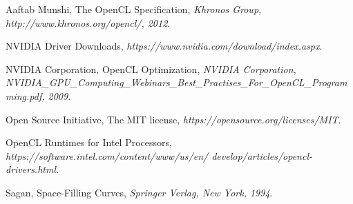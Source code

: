 \documentclass[a4paper,12pt]{article}
\begin{document}
\begin{thebibliography}{99}
	Aaftab Munshi,
	The OpenCL Specification,
	\emph{Khronos Group, http://www.khronos.org/opencl/, 2012}.

	NVIDIA Driver Downloads,
	\emph{https://www.nvidia.com/download/index.aspx}.

	NVIDIA Corporation,
	OpenCL Optimization,
	\emph{NVIDIA Corporation, NVIDIA\_GPU\_Computing\_Webinars\_Best\_Practises\_For\_OpenCL\_Programming.pdf, 2009}.

	Open Source Initiative,
	The MIT license,
	\emph{https://opensource.org/licenses/MIT}.

	OpenCL Runtimes for Intel Processors,
	\emph{https://software.intel.com/content/www/us/en/ develop/articles/opencl-drivers.html}.

	Sagan,
	Space-Filling Curves,
	\emph{Springer Verlag, New York, 1994}.


\end{thebibliography}
\end{document}
